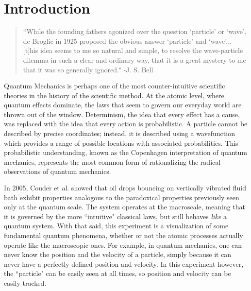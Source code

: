		
\chapter*{Introduction}
\begin{quote}
	    ``While the founding fathers agonized over the question `particle' or `wave', de Broglie in 1925 proposed the obvious answer `particle' and `wave'... [t]his idea seems to me so natural and simple, to resolve the wave-particle dilemma in such a clear and ordinary way, that it is a great mystery to me that it was so generally ignored." -J. S. Bell
	    \end{quote}
	    

	    


Quantum Mechanics is perhaps one of the most counter-intuitive scientific theories in the history of the scientific method. At the atomic level, where quantum effects dominate, the laws that seem to govern our everyday world are thrown out of the window. Determinism, the idea that every effect has a cause, was replaced with the idea that every action is probabilistic. A particle cannot be described by precise coordinates; instead, it is described using a wavefunction which provides a range of possible locations with associated probabilities. This probabilistic understanding, known as the Copenhagen interpretation of quantum mechanics, represents the most common form of rationalizing the radical observations of quantum mechanics. 

In 2005, Couder et al. showed that oil drops bouncing on vertically vibrated fluid bath exhibit properties analogous to the paradoxical properties previously seen only at the quantum scale.  The system operates at the macroscale, meaning that it is governed by the more ``intuitive" classical laws, but still behaves \textit{like} a quantum system. With that said, this experiment is a visualization of some fundamental quantum phenomena, whether or not the atomic processes actually operate like the macroscopic ones. For example, in quantum mechanics, one can never know the position and the velocity of a particle, simply because it can never have a perfectly defined position and velocity. In this experiment however, the ``particle" can be easily seen at all times, so position and velocity can be easily tracked. 

